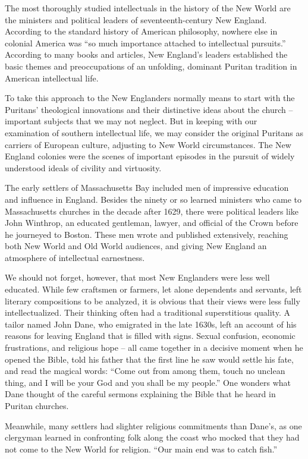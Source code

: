 The most thoroughly studied intellectuals in the history of the New World are the ministers and political leaders of seventeenth-century New England. According to the standard history of American philosophy, nowhere else in colonial America was ``so much importance attached to intellectual pursuits.'' According to many books and articles, New England's leaders established the basic themes and preoccupations of an unfolding, dominant Puritan tradition in American intellectual life.


To take this approach to the New Englanders normally means to start with the Puritans' theological innovations and their distinctive ideas about the church – important subjects that we may not neglect. But in keeping with our examination of southern intellectual life, we may consider the original Puritans as carriers of European culture, adjusting to New World circumstances. The New England colonies were the scenes of important episodes in the pursuit of widely understood ideals of civility and virtuosity.


The early settlers of Massachusetts Bay included men of impressive education and influence in England. Besides the ninety or so learned ministers who came to Massachusetts churches in the decade after 1629, there were political leaders like John Winthrop, an educated gentleman, lawyer, and official of the Crown before he journeyed to Boston. These men wrote and published extensively, reaching both New World and Old World audiences, and giving New England an atmosphere of intellectual earnestness.


We should not forget, however, that most New Englanders were less well educated. While few craftsmen or farmers, let alone dependents and servants, left literary compositions to be analyzed, it is obvious that their views were less fully intellectualized. Their thinking often had a traditional superstitious quality. A tailor named John Dane, who emigrated in the late 1630s, left an account of his reasons for leaving England that is filled with signs. Sexual confusion, economic frustrations, and religious hope – all came together in a decisive moment when he opened the Bible, told his father that the first line he saw would settle his fate, and read the magical words: ``Come out from among them, touch no unclean thing, and I will be your God and you shall be my people.'' One wonders what Dane thought of the careful sermons explaining the Bible that he heard in Puritan churches.


Meanwhile, many settlers had slighter religious commitments than Dane's, as one clergyman learned in confronting folk along the coast who mocked that they had not come to the New World for religion. ``Our main end was to catch fish.''